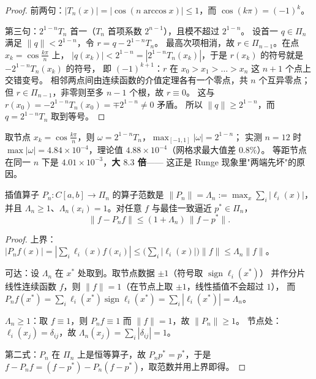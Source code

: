 \begin{proof}
前两句：$|T_n(x)|=|\cos(n\arccos x)|\le1$，而 $\cos(k\pi)=(-1)^k$。

第三句：$2^{1-n}T_n$ 首一（$T_n$ 首项系数 $2^{n-1}$），且模不超过 $2^{1-n}$。
设首一 $q\in\Pi_n$ 满足 $\|q\|<2^{1-n}$，令 $r=q-2^{1-n}T_n$。
最高次项相消，故 $r\in\Pi_{n-1}$。在点 $x_k=\cos\frac{k\pi}{n}$ 上，
$|q(x_k)|<2^{1-n}=|2^{1-n}T_n(x_k)|$，于是 $r(x_k)$ 的符号就是 $-2^{1-n}T_n(x_k)$ 的符号，
即 $(-1)^{k+1}$：$r$ 在 $x_0>x_1>\dots>x_n$ 这 $n+1$ 个点上交错变号。
相邻两点间由连续函数的介值定理各有一个零点，共 $n$ 个互异零点；
但 $r\in\Pi_{n-1}$，非零则至多 $n-1$ 个根，故 $r\equiv0$。
这与 $r(x_0)=-2^{1-n}T_n(x_0)=\mp2^{1-n}\ne0$ 矛盾。
所以 $\|q\|\ge2^{1-n}$，而 $q=2^{1-n}T_n$ 取到等号。
\end{proof}

\begin{corollary}
\label{cor:lobatto}
取节点 $x_k=\cos\frac{k\pi}{n}$，则 $\omega=2^{1-n}T_n$，$\max_{[-1,1]}|\omega|=2^{1-n}$；
实测 $n=12$ 时 $\max|\omega|=4.84\times10^{-4}$，理论值 $4.88\times10^{-4}$（网格求最大值差 $0.8\%$）。
等距节点在同一 $n$ 下是 $4.01\times10^{-3}$，\textbf{大 $8.3$ 倍}——
这正是 Runge 现象里"两端先坏"的原因。
\end{corollary}

\begin{theorem}
\label{thm:lebesgue}
插值算子 $P_n:C[a,b]\to\Pi_n$ 的算子范数是 $\|P_n\|=\Lambda_n:=\max_{x}\sum_i|\ell_i(x)|$，
并且 $\Lambda_n\ge1$、$\Lambda_n(x_i)=1$。对任意 $f$ 与最佳一致逼近 $p^*\in\Pi_n$，
\[
  \|f-P_nf\|\le(1+\Lambda_n)\,\|f-p^*\| .
\]
\end{theorem}

\begin{proof}
上界：$|P_nf(x)|=|\sum_i\ell_i(x)f(x_i)|\le\bigl(\sum_i|\ell_i(x)|\bigr)\|f\|\le\Lambda_n\|f\|$。

可达：设 $\Lambda_n$ 在 $x^*$ 处取到。取节点数据 $\pm1$（符号取 $\operatorname{sign}\ell_i(x^*)$）
并作分片线性连续函数 $f$，则 $\|f\|=1$（在节点上取 $\pm1$，线性插值不会超过 $1$），
而 $P_nf(x^*)=\sum_i\ell_i(x^*)\operatorname{sign}\ell_i(x^*)=\sum_i|\ell_i(x^*)|=\Lambda_n$。

$\Lambda_n\ge1$：取 $f\equiv1$，则 $P_nf\equiv1$ 而 $\|f\|=1$，故 $\|P_n\|\ge1$。
节点处：$\ell_i(x_j)=\delta_{ij}$，故 $\Lambda_n(x_j)=\sum_i|\delta_{ij}|=1$。

第二式：$P_n$ 在 $\Pi_n$ 上是恒等算子，故 $P_np^*=p^*$，于是
$f-P_nf=(f-p^*)-P_n(f-p^*)$，取范数并用上界即得。
\end{proof}

